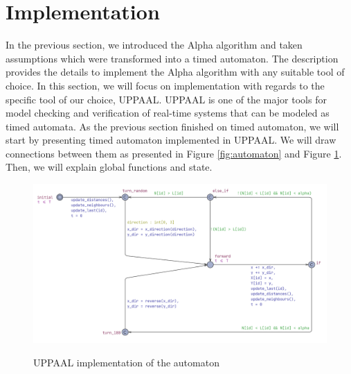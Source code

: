 \section{Implementation}
In the previous section, we introduced the Alpha algorithm and taken assumptions which were transformed into a timed automaton. The description provides the details to implement the Alpha algorithm with any suitable tool of choice. In this section, we will focus on implementation with regards to the specific tool of our choice, UPPAAL. UPPAAL is one of the major tools for model checking and verification of real-time systems that can be modeled as timed automata. As the previous section finished on timed automaton, we will start by presenting timed automaton implemented in UPPAAL. We will draw connections between them as presented in Figure \ref{fig:automaton} and Figure \ref{fig:automaton_uppaal}. Then, we will explain global functions and state.

\begin{figure}[H]
\caption{UPPAAL implementation of the automaton}
\includegraphics[scale=0.3]{images/automaton_uppaal.png}
\label{fig:automaton_uppaal}
\end{figure}


